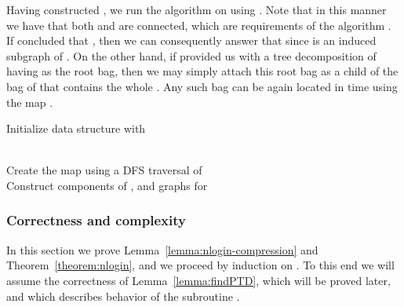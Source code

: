 \documentclass[a4paper,11pt]{article}
\theoremstyle{definition}
\theoremstyle{remark}
\begin{document}
Having constructed , we run the algorithm  on
 using .  Note that in this manner we have that both
 and  are connected, which are requirements of
the algorithm .  If  concluded that
, then we can consequently answer that  since
 is an induced subgraph of .  On the other hand, if
 provided us with a tree decomposition  of
 having  as the root bag, then we may simply attach this
root bag as a child of the bag of  that contains the whole
.  Any such bag can be again located in  time
using the map .

\begin{algorithm}
  
  
  \Indp \BlankLine
  Initialize data structure  with \\
  
  \\
  \If{}{ \KwRet{} }
  
  Create the map  using a DFS traversal of \\
  
  Construct components  of , and graphs  for \\
  
  \BlankLine {}
  
  \KwRet{}
  
  \caption{}
  \label{alg:nlogin-compress-i}
\end{algorithm}

\subsubsection{Correctness and complexity}
In this section we prove Lemma~\ref{lemma:nlogin-compression} and
Theorem~\ref{theorem:nlogin}, and we proceed by induction on .
To this end we will assume the correctness of
Lemma~\ref{lemma:findPTD}, which will be proved later, and which
describes behavior of the subroutine .
\end{document}
